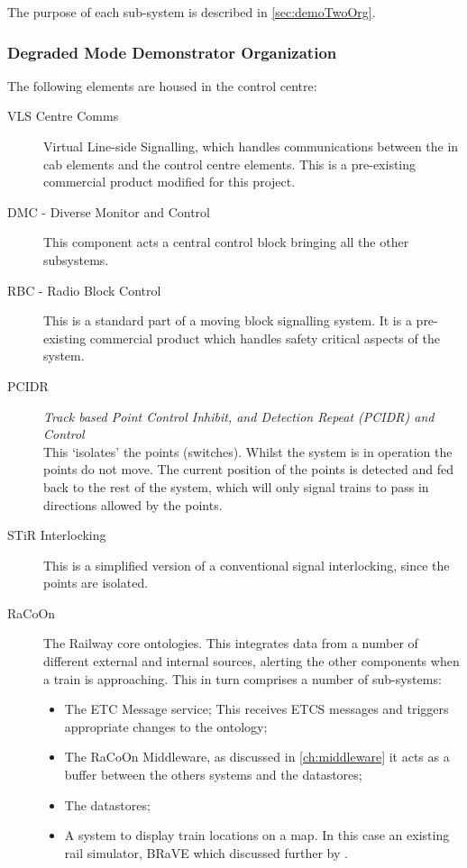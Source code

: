 The purpose of each sub-system is described in \autoref{sec:demoTwoOrg}. 

\subsubsection{Degraded Mode Demonstrator Organization}
\label{sec:demoTwoOrg}
The following elements are housed in the control centre:

\begin{description}
    \item[VLS Centre Comms] Virtual Line-side Signalling, which handles communications between the in cab elements and the control centre elements. This is a pre-existing commercial product modified for this project.
    \item[DMC - Diverse Monitor and Control] This component acts a central control block bringing all the other subsystems.
    \item[RBC - Radio Block Control] This is a standard part of a moving block signalling system.  It is a pre-existing commercial product which handles safety critical aspects of the system.
    \item[PCIDR]  \textit{Track based Point Control Inhibit, and Detection Repeat (PCIDR) and Control} \\
    This `isolates' the points (switches). Whilst the system is in operation the points do not move. The current position of the points is detected and fed back to the rest of the system, which will only signal trains to pass in directions allowed by the points.
    \item[STiR Interlocking] This is a simplified version of a conventional signal interlocking, since the points are isolated.
    \item[RaCoOn] The Railway core ontologies. This integrates data from a number of different external and internal sources, alerting the other components when a train is approaching. This in turn comprises a number of sub-systems:
    \begin{itemize}
        \item The ETC Message service; This receives ETCS messages and triggers appropriate changes to the ontology;
        \item The RaCoOn Middleware, as discussed in \autoref{ch:middleware} it acts as a buffer between the others systems and the datastores;
        \item The datastores;
        \item A system to display train locations on a map. In this case an existing rail simulator, BRaVE which discussed further by \citet{Wen2015}.
    \end{itemize}

\end{description}

